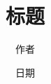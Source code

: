 \documentclass[a4paper,12pt]{article}
\begin{document}
\begin{CJK}{UTF8}{song}
\title{标题}
\author{作者}
\date{日期}
\maketitle
\normalsize

\tableofcontents

%

\end{CJK}
\end{document}
